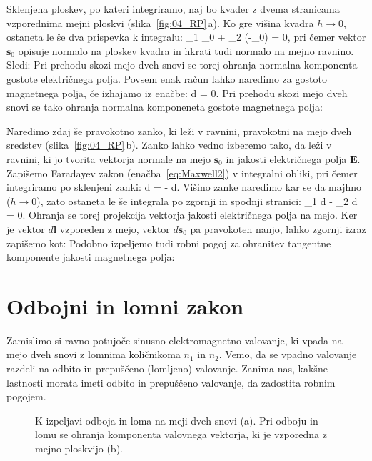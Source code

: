 Sklenjena ploskev, po kateri integriramo, naj bo kvader z dvema stranicama
vzporednima mejni ploskvi (slika~\ref{fig:04_RP}\,a). 
Ko gre višina kvadra $h \to 0$, ostaneta le še dva prispevka k integralu:
\beq
{}_1 \cdot {}_0 + _2 \cdot (-_0) = 0,
\label{eq:04_02}
\eeq
pri čemer vektor $\mathbf{s}_0 $ opisuje normalo na ploskev kvadra in hkrati
tudi normalo na mejno ravnino. Sledi:
Pri prehodu skozi mejo dveh snovi se torej ohranja normalna komponenta gostote
električnega polja. Povsem enak račun lahko naredimo za gostoto magnetnega polja, 
če izhajamo iz enačbe:
\beq
\oint {}\cdot d = 0.
\label{eq:04_03}
\eeq
Pri prehodu skozi mejo dveh snovi se tako ohranja normalna komponeneta
gostote magnetnega polja:

Naredimo zdaj še pravokotno zanko, ki leži v ravnini, pravokotni na mejo dveh 
sredstev (slika~\ref{fig:04_RP}\,b). Zanko 
lahko vedno izberemo tako, da leži v ravnini, ki jo tvorita vektorja normale na 
mejo $\mathbf{s}_0$ in jakosti električnega polja $\mathbf{E}$. 
Zapišemo Faradayev zakon (enačba~\ref{eq:Maxwell2}) v integralni obliki, pri 
čemer integriramo po sklenjeni zanki:
\beq
\oint {}\cdot d = - \int {}\cdot d.
\label{eq:04_04}
\eeq
Višino zanke naredimo kar se da majhno ($h \to 0$), zato ostaneta le še 
integrala po zgornji in spodnji stranici:
\beq
{}_1 \cdot d - _2 \cdot d = 0.
\label{eq:04_05}
\eeq
Ohranja se torej projekcija vektorja jakosti električnega polja na mejo. 
Ker je vektor $d\mathbf{l}$ vzporeden z mejo, vektor $d\mathbf{s}_0$ pa 
pravokoten nanjo, lahko zgornji izraz zapišemo kot:
Podobno izpeljemo tudi robni pogoj za ohranitev tangentne komponente
jakosti magnetnega polja:

\section{Odbojni in lomni zakon}
Zamislimo si ravno potujoče sinusno elektromagnetno valovanje, ki vpada na mejo dveh snovi
z lomnima količnikoma $n_1$ in $n_2$. Vemo, da se vpadno valovanje razdeli na odbito in prepuščeno (lomljeno) valovanje. Zanima nas, kakšne lastnosti morata imeti odbito in prepuščeno valovanje, da zadostita robnim pogojem. 
\begin{figure}[ht]
\centering
\def\svgwidth{120truemm} 

\caption{K izpeljavi odboja in loma na meji dveh snovi (a). Pri odboju in lomu
se ohranja komponenta valovnega vektorja, ki je vzporedna z mejno ploskvijo (b).}
\label{fig:04_lom}
\end{figure}

